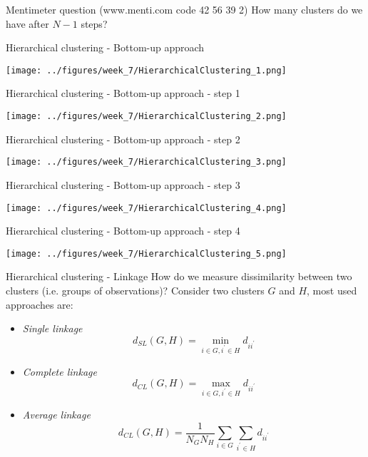 \documentclass[notes]{beamer}          %
\begin{document}
\begin{frame}{Mentimeter question (www.menti.com code 42 56 39 2)}
How many clusters do we have after $N-1$ steps?
\end{frame}

\begin{frame}{Hierarchical clustering - Bottom-up approach }
\begin{center}
\texttt{[image: ../figures/week\_7/HierarchicalClustering\_1.png]}  
\end{center}
\end{frame}

\begin{frame}{Hierarchical clustering - Bottom-up approach - step 1}
\begin{center}
\texttt{[image: ../figures/week\_7/HierarchicalClustering\_2.png]}  
\end{center}
\end{frame}

\begin{frame}{Hierarchical clustering - Bottom-up approach - step 2}
\begin{center}
\texttt{[image: ../figures/week\_7/HierarchicalClustering\_3.png]}  
\end{center}
\end{frame}

\begin{frame}{Hierarchical clustering - Bottom-up approach - step 3}
\begin{center}
\texttt{[image: ../figures/week\_7/HierarchicalClustering\_4.png]}  
\end{center}
\end{frame}

\begin{frame}{Hierarchical clustering - Bottom-up approach - step 4}
\begin{center}
\texttt{[image: ../figures/week\_7/HierarchicalClustering\_5.png]}  
\end{center}
\end{frame}

\begin{frame}{Hierarchical clustering - Linkage}
How do we measure dissimilarity between two clusters (i.e. groups of observations)?
Consider two clusters $G$ and $H$, most used approaches are: 
\begin{itemize}
\item \textit{Single linkage}
\begin{equation*}
	d_{SL}(G, H) = \min_{i \in G, i^\prime \in H} d_{ii^\prime}
\end{equation*}
\item \textit{Complete linkage}
\begin{equation*}
	d_{CL}(G, H) = \max_{i \in G, i^\prime \in H} d_{ii^\prime}
\end{equation*}
\item \textit{Average linkage}
\begin{equation*}
	d_{CL}(G, H) = \frac{1}{N_G N_H} \sum_{i \in G} \sum_{i^\prime \in H}  d_{ii^\prime}
\end{equation*}
\end{itemize}
\end{frame}
\end{document}
